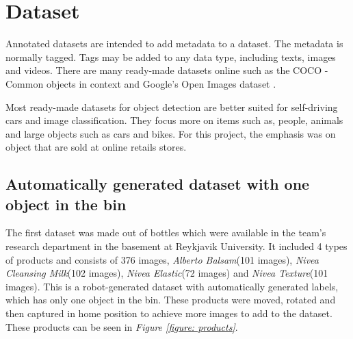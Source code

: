 \section{Dataset}
Annotated datasets are intended to add metadata to a dataset. The metadata is normally tagged. Tags may be added to any data type, including texts, images and videos. There are many ready-made datasets online such as the COCO - Common objects in context \cite{noauthor_coco_nodate} and Google’s Open Images dataset \cite{noauthor_open_nodate}.

Most ready-made datasets for object detection are better suited for self-driving cars and image classification. They focus more on items such as, people, animals and large objects such as cars and bikes. For this project, the emphasis was on object that are sold at online retails stores.
\subsection{Automatically generated dataset with one object in the bin} \label{sec:firstdataset}
The first dataset was made out of bottles which were available in the team’s research department in the basement at Reykjavik University. It included 4 types of products and consists of 376 images, \textit{Alberto Balsam}(101 images), \textit{Nivea Cleansing Milk}(102 images), \textit{Nivea Elastic}(72 images) and \textit{Nivea Texture}(101 images). 
This is a robot-generated dataset with automatically generated labels, which has only one object in the bin. 
These products were moved, rotated and then captured in home position to achieve more images to add to the dataset. 
These products can be seen in \textit{Figure \ref{figure: products}}.


